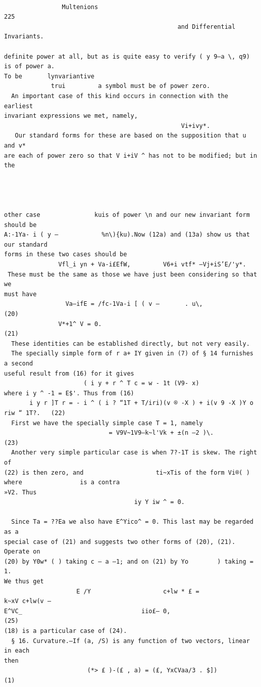\documentclass[10pt]{article}
\begin{document}
\clearpage
\begin{verbatim}

                Multenions                                                225
                                                and Differential Invariants.

definite power at all, but as is quite easy to verify ( y 9—a \, q9) is of power a.
To be       lynvariantive
             trui         a symbol must be of power zero.
  An important case of this kind occurs in connection with the earliest
invariant expressions we met, namely,
                                                 Vi+ivy*.
   Our standard forms for these are based on the supposition that u and v*
are each of power zero so that V i+iV ^ has not to be modified; but in the




other case               kuis of power \n and our new invariant form should be
A:-1Ya- i ( y —            %n\){ku).Now (12a) and (13a) show us that our standard
forms in these two cases should be
               Vfl_i yn + Va-i£EfW,         V6+i vtf* —Vj+iS’E/'y*.
 These must be the same as those we have just been considering so that we
must have
                 Va—ifE = /fc-1Va-i [ ( v —       . u\,              (20)
               V*+1^ V = 0.                                         (21)
  These identities can be established directly, but not very easily.
  The specially simple form of r a+ IY given in (7) of § 14 furnishes a second
useful result from (16) for it gives
                      ( i y + r ^ T c = w - 1t (V9- x)
where i y ^ -1 = E$'. Thus from (16)
       i y r ]T r = - i ^ ( i ? “1T + T/iri)(v ® -X ) + i(v 9 -X )Y o riw “ 1T?.   (22)
  First we have the specially simple case T = 1, namely
                             = V9V~1V9—k~l'Vk + ±(n —2 )\.                         (23)
  Another very simple particular case is when 7?-1T is skew. The right of
(22) is then zero, and                    ti~xTis of the form Vi®( ) where                is a contra
»V2. Thus
                                    iy Y iw ^ = 0.

  Since Ta = ??Ea we also have E^Yico^ = 0. This last may be regarded as a
special case of (21) and suggests two other forms of (20), (21). Operate on
(20) by Y0w* ( ) taking c — a —1; and on (21) by Yo        ) taking =     1.
We thus get
                    E /Y                    c+lw * £ =              k~xV c+lw(v —
E^VC_                                 iio£— 0,                           (25)
(18) is a particular case of (24).
  § 16. Curvature.—If (a, /S) is any function of two vectors, linear in each
then
                       (*> £ )-(£ , a) = (£, YxCVaa/3 . $])                         (1)


\end{verbatim}
\end{document}
